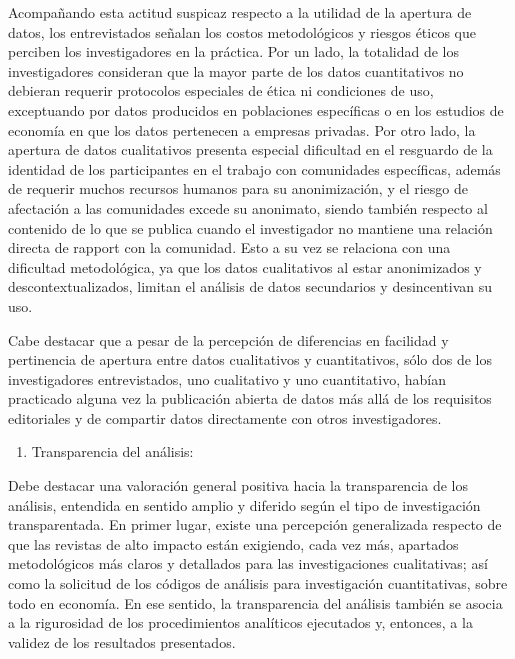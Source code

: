 \documentclass[
  letterpaper,
  DIV=11,
  numbers=noendperiod]{scrreprt}
\providecommand{\tightlist}{%
  \setlength{\itemsep}{0pt}\setlength{\parskip}{0pt}}\usepackage{longtable,booktabs,array}
\begin{document}
Acompañando esta actitud suspicaz respecto a la utilidad de la apertura
de datos, los entrevistados señalan los costos metodológicos y riesgos
éticos que perciben los investigadores en la práctica. Por un lado, la
totalidad de los investigadores consideran que la mayor parte de los
datos cuantitativos no debieran requerir protocolos especiales de ética
ni condiciones de uso, exceptuando por datos producidos en poblaciones
específicas o en los estudios de economía en que los datos pertenecen a
empresas privadas. Por otro lado, la apertura de datos cualitativos
presenta especial dificultad en el resguardo de la identidad de los
participantes en el trabajo con comunidades específicas, además de
requerir muchos recursos humanos para su anonimización, y el riesgo de
afectación a las comunidades excede su anonimato, siendo también
respecto al contenido de lo que se publica cuando el investigador no
mantiene una relación directa de rapport con la comunidad. Esto a su vez
se relaciona con una dificultad metodológica, ya que los datos
cualitativos al estar anonimizados y descontextualizados, limitan el
análisis de datos secundarios y desincentivan su uso.

Cabe destacar que a pesar de la percepción de diferencias en facilidad y
pertinencia de apertura entre datos cualitativos y cuantitativos, sólo
dos de los investigadores entrevistados, uno cualitativo y uno
cuantitativo, habían practicado alguna vez la publicación abierta de
datos más allá de los requisitos editoriales y de compartir datos
directamente con otros investigadores.

\begin{enumerate}
\def\labelenumi{\alph{enumi})}
\setcounter{enumi}{3}
\tightlist
\item
  Transparencia del análisis:
\end{enumerate}

Debe destacar una valoración general positiva hacia la transparencia de
los análisis, entendida en sentido amplio y diferido según el tipo de
investigación transparentada. En primer lugar, existe una percepción
generalizada respecto de que las revistas de alto impacto están
exigiendo, cada vez más, apartados metodológicos más claros y detallados
para las investigaciones cualitativas; así como la solicitud de los
códigos de análisis para investigación cuantitativas, sobre todo en
economía. En ese sentido, la transparencia del análisis también se
asocia a la rigurosidad de los procedimientos analíticos ejecutados y,
entonces, a la validez de los resultados presentados.
\end{document}
